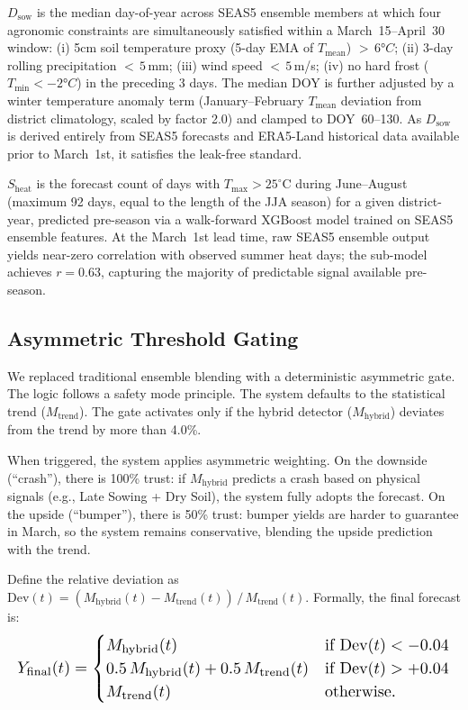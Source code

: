 $D_{\text{sow}}$ is the median day-of-year across SEAS5 ensemble members at which four agronomic constraints are simultaneously satisfied within a March~15--April~30 window: (i) 5cm soil temperature proxy (5-day EMA of $T_{\text{mean}}$) ${>}\,6°C$; (ii) 3-day rolling precipitation ${<}\,5$\,mm; (iii) wind speed ${<}\,5$\,m/s; (iv) no hard frost ($T_{\text{min}} < -2°C$) in the preceding 3 days. The median DOY is further adjusted by a winter temperature anomaly term (January--February $T_{\text{mean}}$ deviation from district climatology, scaled by factor 2.0) and clamped to DOY~60--130. As $D_{\text{sow}}$ is derived entirely from SEAS5 forecasts and ERA5-Land historical data available prior to March~1st, it satisfies the leak-free standard.

$S_{\text{heat}}$ is the forecast count of days with $T_{\text{max}} > 25^\circ\text{C}$ during June--August (maximum 92 days, equal to the length of the JJA season) for a given district-year, predicted pre-season via a walk-forward XGBoost model trained on SEAS5 ensemble features. At the March~1st lead time, raw SEAS5 ensemble output yields near-zero correlation with observed summer heat days; the sub-model achieves $r = 0.63$, capturing the majority of predictable signal available pre-season.

\subsection{Asymmetric Threshold Gating}
We replaced traditional ensemble blending with a deterministic asymmetric gate. The logic follows a safety mode principle. The system defaults to the statistical trend ($M_{\text{trend}}$). The gate activates only if the hybrid detector ($M_{\text{hybrid}}$) deviates from the trend by more than {4.0\%}.

When triggered, the system applies asymmetric weighting. On the downside (``crash''), there is 100\% trust: if $M_{\text{hybrid}}$ predicts a crash based on physical signals (e.g., Late Sowing + Dry Soil), the system fully adopts the forecast. On the upside (``bumper''), there is 50\% trust: bumper yields are harder to guarantee in March, so the system remains conservative, blending the upside prediction with the trend.

Define the relative deviation as $\text{Dev}(t) = (M_{\text{hybrid}}(t) - M_{\text{trend}}(t))\, /\, M_{\text{trend}}(t)$. Formally, the final forecast is:
\begin{equation*}
\resizebox{\columnwidth}{!}{%
$Y_{\text{final}}(t) = \begin{cases}
M_{\text{hybrid}}(t) & \text{if } \text{Dev}(t) < -0.04 \\
0.5\, M_{\text{hybrid}}(t) + 0.5\, M_{\text{trend}}(t) & \text{if } \text{Dev}(t) > +0.04 \\
M_{\text{trend}}(t) & \text{otherwise.}
\end{cases}$%
}
\end{equation*}

